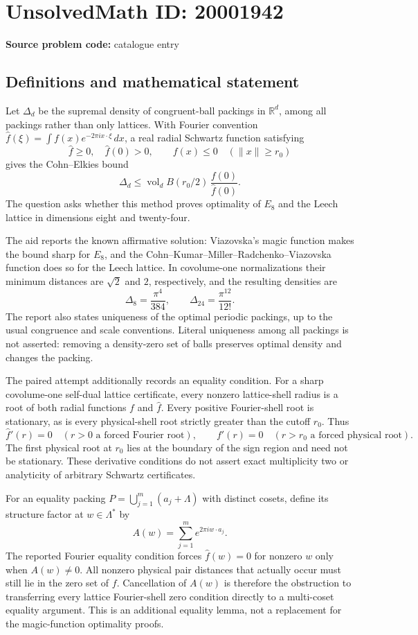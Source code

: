 \documentclass[11pt]{article}
\begin{document}
\section*{UnsolvedMath ID: 20001942}
\textbf{Source problem code:} catalogue entry
\subsection{Definitions and mathematical statement}
Let \(\Delta_d\) be the supremal density of congruent-ball packings in \(\mathbb R^d\), among all packings rather than only lattices. With Fourier convention \(\widehat f(\xi)=\int f(x)e^{-2\pi i x\cdot\xi}\,dx\), a real radial Schwartz function satisfying
\[
 \widehat f\geq0,\quad\widehat f(0)>0,\qquad
 f(x)\leq0\quad(\|x\|\geq r_0)
\]
gives the Cohn--Elkies bound
\[
 \Delta_d\leq\operatorname{vol}_d B(r_0/2)\,
                       \frac{f(0)}{\widehat f(0)}.
\]
The question asks whether this method proves optimality of \(E_8\) and the Leech lattice in dimensions eight and twenty-four.

The aid reports the known affirmative solution: Viazovska's magic function makes the bound sharp for \(E_8\), and the Cohn--Kumar--Miller--Radchenko--Viazovska function does so for the Leech lattice. In covolume-one normalizations their minimum distances are \(\sqrt2\) and \(2\), respectively, and the resulting densities are
\[
 \Delta_8=\frac{\pi^4}{384},\qquad
 \Delta_{24}=\frac{\pi^{12}}{12!}.
\]
The report also states uniqueness of the optimal periodic packings, up to the usual congruence and scale conventions. Literal uniqueness among all packings is not asserted: removing a density-zero set of balls preserves optimal density and changes the packing.

The paired attempt additionally records an equality condition. For a sharp covolume-one self-dual lattice certificate, every nonzero lattice-shell radius is a root of both radial functions \(f\) and \(\widehat f\). Every positive Fourier-shell root is stationary, as is every physical-shell root strictly greater than the cutoff \(r_0\). Thus
\[
 \widehat f'(r)=0\quad(r>0\text{ a forced Fourier root}),\qquad
 f'(r)=0\quad(r>r_0\text{ a forced physical root}).
\]
The first physical root at \(r_0\) lies at the boundary of the sign region and need not be stationary. These derivative conditions do not assert exact multiplicity two or analyticity of arbitrary Schwartz certificates.

For an equality packing \(P=\bigcup_{j=1}^m(a_j+\Lambda)\) with distinct cosets, define its structure factor at \(w\in\Lambda^*\) by
\[
 A(w)=\sum_{j=1}^m e^{2\pi i w\cdot a_j}.
\]
The reported Fourier equality condition forces \(\widehat f(w)=0\) for nonzero \(w\) only when \(A(w)\ne0\). All nonzero physical pair distances that actually occur must still lie in the zero set of \(f\). Cancellation of \(A(w)\) is therefore the obstruction to transferring every lattice Fourier-shell zero condition directly to a multi-coset equality argument. This is an additional equality lemma, not a replacement for the magic-function optimality proofs.
\end{document}
